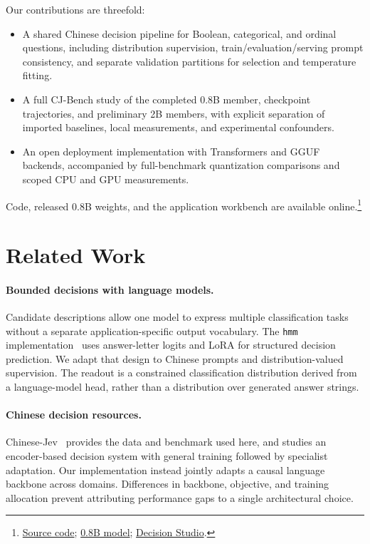 Our contributions are threefold:
\begin{itemize}
\item A shared Chinese decision pipeline for Boolean, categorical, and ordinal questions, including distribution supervision, train/evaluation/serving prompt consistency, and separate validation partitions for selection and temperature fitting.
\item A full CJ-Bench study of the completed 0.8B member, checkpoint trajectories, and preliminary 2B members, with explicit separation of imported baselines, local measurements, and experimental confounders.
\item An open deployment implementation with Transformers and GGUF backends, accompanied by full-benchmark quantization comparisons and scoped CPU and GPU measurements.
\end{itemize}

Code, released 0.8B weights, and the application workbench are available online.\footnote{\href{https://github.com/yanqiangmiffy/chinese-decision}{Source code}; \href{https://huggingface.co/quincyqiang/chinese-decision-0.8b}{0.8B model}; \href{https://github.com/yanqiangmiffy/chinese-decision-studio}{Decision Studio}.}

\section{Related Work}
\label{sec:related}
\paragraph{Bounded decisions with language models.}
Candidate descriptions allow one model to express multiple classification tasks without a separate application-specific output vocabulary. The \texttt{hmm} implementation~\citep{hmm2026} uses answer-letter logits and LoRA for structured decision prediction. We adapt that design to Chinese prompts and distribution-valued supervision. The readout is a constrained classification distribution derived from a language-model head, rather than a distribution over generated answer strings.

\paragraph{Chinese decision resources.}
Chinese-Jev~\citep{wang2026chinesejev} provides the data and benchmark used here, and studies an encoder-based decision system with general training followed by specialist adaptation. Our implementation instead jointly adapts a causal language backbone across domains. Differences in backbone, objective, and training allocation prevent attributing performance gaps to a single architectural choice.

